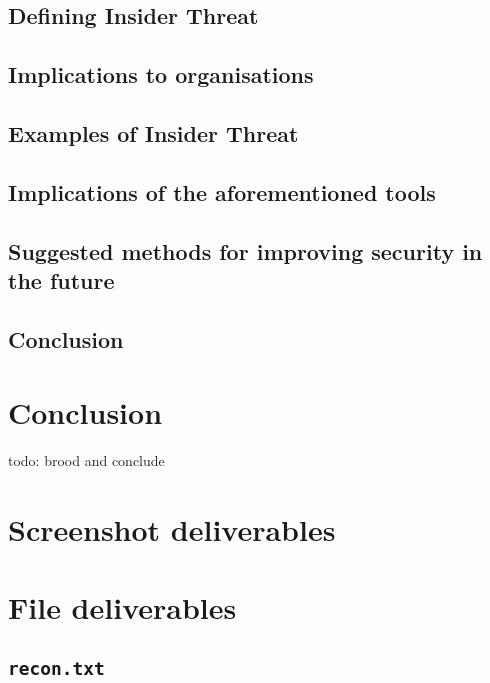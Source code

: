 \documentclass[12pt]{report}
\begin{document}
\section{Defining Insider Threat}
\section{Implications to organisations}
\section{Examples of Insider Threat}
\section{Implications of the aforementioned tools}
\section{Suggested methods for improving security in the future}
\section{Conclusion}


\pagebreak
\chapter{Conclusion}
todo: brood and conclude




\nocite{example:referenceid:here}

\begin{flushleft}
  
\end{flushleft}


\appendix

\pagebreak
\chapter{Screenshot deliverables}
\label{app:screenshots}

\pagebreak
\chapter{File deliverables}
\section{\texttt{recon.txt}}
\label{app:files:recon}

\end{document}
